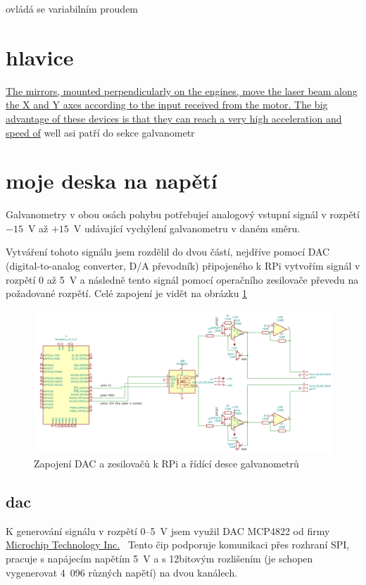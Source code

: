 \documentclass{template/socthesis}
\begin{document}
ovládá se variabilním proudem

\section{hlavice}
\href{https://elenlaser.com/blog/galvo-head-laser-focus-tool.html}{The mirrors, mounted perpendicularly on the engines, move the laser beam along the X and Y axes according to the input received from the motor.
The big advantage of these devices is that they can reach a very high acceleration and speed of}
well asi patří do sekce galvanometr

\section{moje deska na napětí}
Galvanometry v obou osách pohybu potřebujeí analogový vstupní signál v rozpětí $-15$~V až $+15$~V udávající vychýlení galvanometru v daném směru.

Vytváření tohoto signálu jsem rozdělil do dvou částí, nejdříve pomocí DAC (digital-to-analog converter, D/A převodník) připojeného k RPi vytvořím signál v rozpětí 0 až 5~V a následně tento signál pomocí operačního zesilovače převedu na požadované rozpětí.
Celé zapojení je vidět na obrázku \ref{fig:dac_board}
\begin{figure}[!htb]
  \centering
  \includegraphics[width=1\textwidth]{img/dac_board.png} %
  \caption{\label{fig:dac_board}Zapojení DAC a zesilovačů k RPi a řídící desce galvanometrů}
\end{figure}

\subsection{dac}
K generování signálu v rozpětí 0--5~V jsem využil DAC MCP4822 od firmy \href{https://www.microchip.com}{Microchip Technology Inc.}\ 
Tento čip podporuje komunikaci přes rozhraní SPI, pracuje s napájecím napětím 5~V a s 12bitovým rozlišením (je schopen vygenerovat 4~096 různých napětí) na dvou kanálech.
\end{document}

